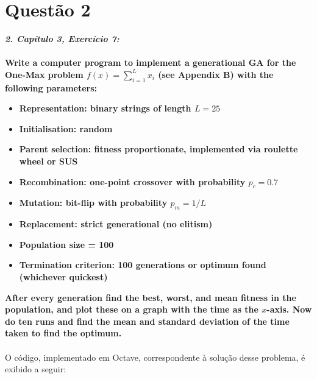 \documentclass{report}
\begin{document}
	\section*{Questão 2}
	
	\textbf{\textit{2. Capítulo 3, Exercício 7:}}\\\\
	\textbf{Write a computer program to implement a generational GA for the One-Max problem $f(x) = \sum_{i = 1}^{L} x_i$ (see Appendix B) with the following parameters:}\\
	\begin{itemize}
		\item \textbf{Representation: binary strings of length $L = 25$}
		\item \textbf{Initialisation: random}
		\item \textbf{Parent selection: fitness proportionate, implemented via roulette wheel or SUS}
		\item \textbf{Recombination: one-point crossover with probability $p_c = 0.7$}
		\item \textbf{Mutation: bit-flip with probability $p_m = 1/L$}
		\item \textbf{Replacement: strict generational (no elitism)}
		\item \textbf{Population size = 100}
		\item \textbf{Termination criterion: 100 generations or optimum found (whichever quickest)}
	\end{itemize}
	
	\textbf{After every generation find the best, worst, and mean fitness in the population, and plot these on a graph with the time as the $x$-axis. Now do ten runs and find the mean and standard deviation of the time taken to find the optimum.}\\
	
	\paragraph{} O código, implementado em Octave, correspondente à solução desse problema, é exibido a seguir:\\
	
\end{document}
